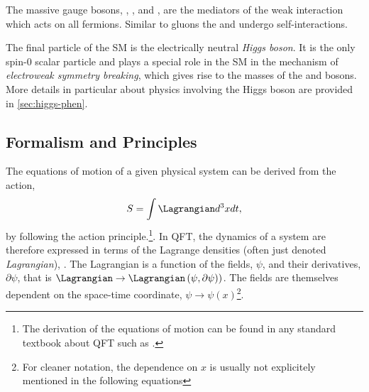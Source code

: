 The massive gauge bosons, \Wplus, \Wminus, and \Zboson, are the mediators of the weak interaction which acts on all fermions. Similar to gluons the \Wmp and \Zboson undergo self-interactions.

The final particle of the SM is the electrically neutral \emph{Higgs boson}. It is the only spin-0 scalar particle and plays a special role in the SM in the mechanism of \emph{electroweak symmetry breaking}, which gives rise to the masses of the \Wpm and \Zboson bosons. More details in particular about physics involving the Higgs boson are provided in \cref{sec:higgs-phen}.


\subsection{Formalism and Principles}
\label{subsec:formalism}

The equations of motion of a given physical system can be derived from the action,
\begin{equation}
  \label{eq:action}
  S = \int \Lagrangian d^3x dt,
\end{equation}
by following the action principle.\footnote{The derivation of the equations of motion can be found in any standard textbook about QFT such as .}.
In QFT, the dynamics of a system are therefore expressed in terms of the Lagrange densities (often just denoted \emph{Lagrangian}), \Lagrangian. 
The Lagrangian is a function of the fields, $\psi$, and their derivatives, $\partial \psi$, that is $\Lagrangian \rightarrow \Lagrangian\left(\psi, \partial\psi)\right)$. The fields are themselves dependent on the space-time coordinate, $\psi \rightarrow \psi(x)$\footnote{For cleaner notation, the dependence on $x$ is usually not explicitely mentioned in the following equations}. 

